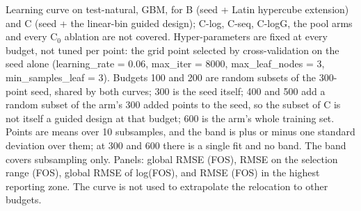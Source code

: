 Learning curve on test-natural, GBM, for B (seed + Latin hypercube extension) and C (seed + the linear-bin guided design); C-log, C-seq, C-logG, the pool arms and every C$_0$ ablation are not covered. Hyper-parameters are fixed at every budget, not tuned per point: the grid point selected by cross-validation on the seed alone (learning\_rate = 0.06, max\_iter = 8000, max\_leaf\_nodes = 3, min\_samples\_leaf = 3). Budgets 100 and 200 are random subsets of the 300-point seed, shared by both curves; 300 is the seed itself; 400 and 500 add a random subset of the arm's 300 added points to the seed, so the subset of C is not itself a guided design at that budget; 600 is the arm's whole training set. Points are means over 10 subsamples, and the band is plus or minus one standard deviation over them; at 300 and 600 there is a single fit and no band. The band covers subsampling only. Panels: global RMSE (FOS), RMSE on the selection range (FOS), global RMSE of log(FOS), and RMSE (FOS) in the highest reporting zone. The curve is not used to extrapolate the relocation to other budgets.
